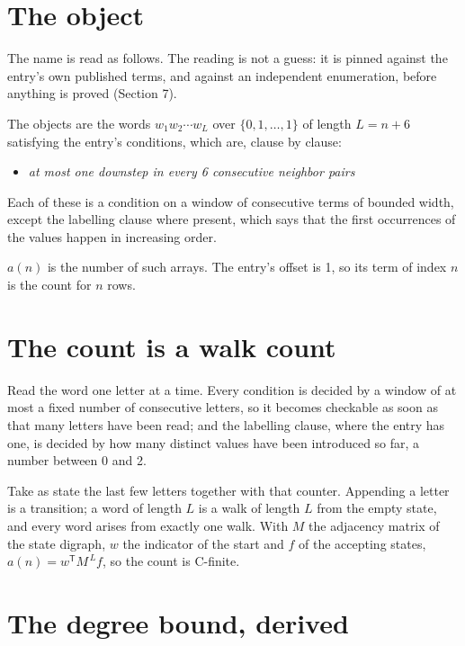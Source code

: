 \documentclass[11pt]{article}
\theoremstyle{definition}
\begin{document}
\section{The object}

The name is read as follows. The reading is not a guess: it is pinned against the entry's own published terms, and against an independent enumeration, before anything is proved (Section 7).

The objects are the words $w_1 w_2 \cdots w_L$ over $\{0,1,\dots,1\}$ of length $L = n + 6$ satisfying the entry's conditions, which are, clause by clause:

\begin{itemize}

\item {\itshape at most one downstep in every 6 consecutive neighbor pairs}

\end{itemize}

Each of these is a condition on a window of consecutive terms of bounded width, except the labelling clause where present, which says that the first occurrences of the values happen in increasing order.

$a(n)$ is the number of such arrays. The entry's offset is 1, so its term of index $n$ is the count for $n$ rows.

\section{The count is a walk count}

Read the word one letter at a time. Every condition is decided by a window of at most a fixed number of consecutive letters, so it becomes checkable as soon as that many letters have been read; and the labelling clause, where the entry has one, is decided by how many distinct values have been introduced so far, a number between $0$ and 2.

Take as state the last few letters together with that counter. Appending a letter is a transition; a word of length $L$ is a walk of length $L$ from the empty state, and every word arises from exactly one walk. With $M$ the adjacency matrix of the state digraph, $w$ the indicator of the start and $f$ of the accepting states, $a(n) = w^{\mathsf T}M^{\,L}f$, so the count is C-finite.

\section{The degree bound, derived}
\end{document}
